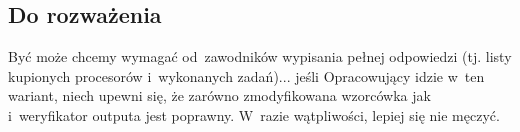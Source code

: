 \documentclass[opr,utf8]{sinol}
\begin{document}
\begin{tasktext}
  \section{Do rozważenia}
    Być może chcemy wymagać od~zawodników wypisania pełnej odpowiedzi (tj.
    listy kupionych procesorów i~wykonanych zadań)... jeśli Opracowujący idzie
    w~ten wariant, niech upewni się, że zarówno zmodyfikowana wzorcówka jak
    i~weryfikator outputa jest poprawny. W~razie wątpliwości, lepiej się nie męczyć.

  \end{tasktext}
\end{document}
